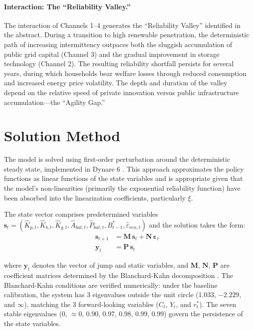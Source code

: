 \documentclass[12pt, a4paper]{article}
\begin{document}
\paragraph{Interaction: The ``Reliability Valley.''}
The interaction of Channels 1--4 generates the ``Reliability Valley'' identified in the abstract. During a transition to high renewable penetration, the deterministic path of increasing intermittency outpaces both the sluggish accumulation of public grid capital (Channel 3) and the gradual improvement in storage technology (Channel 2). The resulting reliability shortfall persists for several years, during which households bear welfare losses through reduced consumption and increased energy price volatility. The depth and duration of the valley depend on the relative speed of private innovation versus public infrastructure accumulation---the ``Agility Gap.''

\section{Solution Method} \label{sec:solution}

The model is solved using first-order perturbation around the deterministic steady state, implemented in Dynare 6 \citep{Adjemianetal2024}. This approach approximates the policy functions as linear functions of the state variables and is appropriate given that the model's non-linearities (primarily the exponential reliability function) have been absorbed into the linearization coefficients, particularly $\xi$.

The state vector comprises predetermined variables $\mathbf{s}_t = (\hat{K}_{p,t}, \hat{K}_{b,t}, \hat{K}_{g,t}, \hat{A}_{bat,t}, \hat{P}_{bat,t}, B^*_{t-1}, \hat{\varepsilon}_{ren,t})$ and the solution takes the form:
\begin{align}
\mathbf{s}_{t+1} &= \mathbf{M} \, \mathbf{s}_t + \mathbf{N} \, \boldsymbol{\varepsilon}_t \\
\mathbf{y}_t &= \mathbf{P} \, \mathbf{s}_t
\end{align}

where $\mathbf{y}_t$ denotes the vector of jump and static variables, and $\mathbf{M}$, $\mathbf{N}$, $\mathbf{P}$ are coefficient matrices determined by the Blanchard-Kahn decomposition \citep{blanchard1980}. The Blanchard-Kahn conditions are verified numerically: under the baseline calibration, the system has 3 eigenvalues outside the unit circle (1.033, $-2.229$, and $\infty$), matching the 3 forward-looking variables ($C_t$, $Y_t$, and $r^*_t$). The seven stable eigenvalues (0, $\approx$0, 0.90, 0.97, 0.98, 0.99, 0.99) govern the persistence of the state variables.
\end{document}
